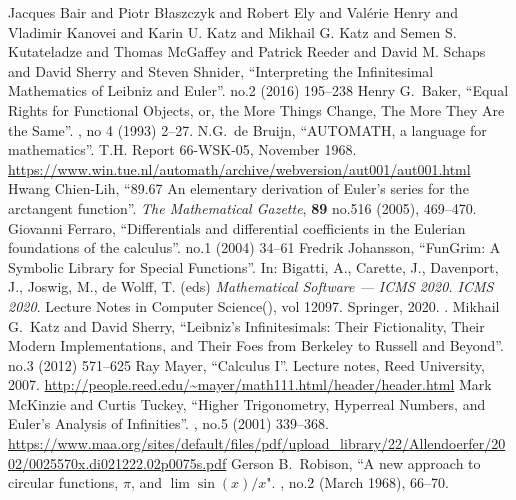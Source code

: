 \begin{thebibliography}{99}\setlength{\parskip}{0pt}
  \setlength{\itemsep}{0pt plus 0.3ex}%
{}
  Jacques Bair and Piotr B{\l}aszczyk and Robert Ely and Val{\'{e}}rie Henry and Vladimir Kanovei and Karin U. Katz and Mikhail G. Katz and Semen S. Kutateladze and Thomas McGaffey and Patrick Reeder and David M. Schaps and David Sherry and Steven Shnider,
  ``Interpreting the Infinitesimal Mathematics of Leibniz and Euler''.
   no.2 (2016) 195--238
  {\tt{}}
  Henry G.~Baker,
  ``Equal Rights for Functional Objects, or, the More Things Change, The More They Are the Same''.
   , no 4 (1993)
  2--27.\newline
  {\tt{}}
  N.G.~de Bruijn,
  ``AUTOMATH, a language for mathematics''.
  T.H. Report 66-WSK-05, November 1968.\newline
  \url{https://www.win.tue.nl/automath/archive/webversion/aut001/aut001.html}
  Hwang Chien-Lih,
  ``89.67 An elementary derivation of Euler's series for the arctangent function''.
  \textit{The Mathematical Gazette}, \textbf{89} no.516 (2005), 469--470.
  {\tt{}}
  Giovanni Ferraro,
  ``Differentials and differential coefficients in the Eulerian foundations of the calculus''.
   no.1 (2004) 34--61
  {\tt{}}
  Fredrik Johansson,
  ``FunGrim: A Symbolic Library for Special Functions''.
  In: Bigatti, A., Carette, J., Davenport, J., Joswig, M., de Wolff, T.
  (eds)
  \textit{Mathematical Software --- ICMS 2020. ICMS 2020}.
  Lecture Notes in Computer Science(), vol 12097. Springer, 2020.\newline
  {\tt{}}.
  Mikhail G.\ Katz and David Sherry,
  ``Leibniz's Infinitesimals: Their Fictionality, Their Modern Implementations, and Their Foes from Berkeley to Russell and Beyond''.
    no.3 (2012) 571--625
  {\tt{}} 
  Ray Mayer,
  ``Calculus I''.
  Lecture notes, Reed University, 2007.\newline
  \url{http://people.reed.edu/~mayer/math111.html/header/header.html}
 Mark McKinzie and Curtis Tuckey,
  ``Higher Trigonometry, Hyperreal Numbers, and Euler's Analysis of Infinities''.
   , no.5 (2001) 339--368.\newline
\url{https://www.maa.org/sites/default/files/pdf/upload_library/22/Allendoerfer/2002/0025570x.di021222.02p0075s.pdf}
 Gerson B.~Robison,
  ``A new approach to circular functions, $\pi$, and $\lim\sin(x)/x$".
   , no.2 (March 1968), 66--70.\newline
{\tt{}}
\end{thebibliography}
